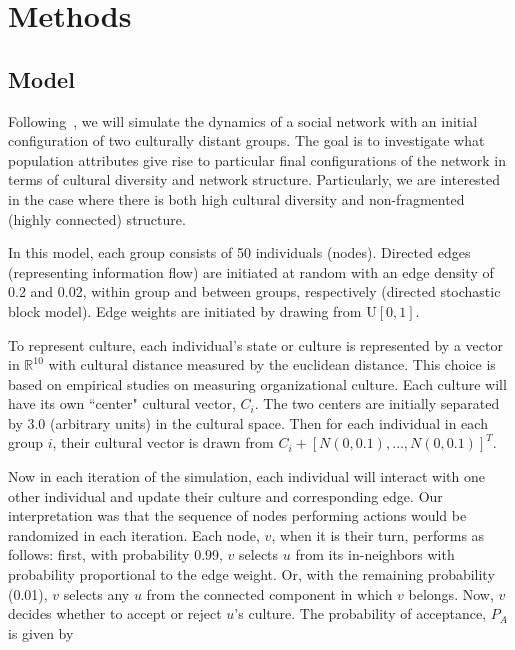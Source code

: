 \section{Methods}\label{sec:methods}

\subsection{Model}\label{subsec:model}
    Following~\citep{social-frag}, we will simulate the dynamics of a social network
    with an initial configuration of two culturally distant groups.
    The goal is to investigate what population attributes give rise to particular
    final configurations of the network in terms of cultural diversity and network structure.
    Particularly, we are interested in the case where there is both high
    cultural diversity and non-fragmented (highly connected) structure.

    In this model, each group consists of 50 individuals (nodes).
    Directed edges (representing information
    flow) are initiated at random with an edge density of 0.2 and 0.02, within group
    and between groups, respectively (directed stochastic block model).
    Edge weights are initiated by drawing from $\textrm{U}[0,1]$.

    To represent culture, each individual's state or culture is represented by a
    vector in $\mathbb{R}^{10}$ with cultural distance measured by the euclidean distance.
    This choice is based on empirical studies on measuring organizational culture.
    Each culture will have its own ``center" cultural vector, $C_i$.
    The two centers are initially
    separated by $3.0$ (arbitrary units) in the cultural space.
    Then for each individual in each group $i$, their cultural vector is drawn from
    $C_i + [N(0, 0.1), \dots , N(0, 0.1)]^T$.

    Now in each iteration of the simulation, each individual will interact with
    one other individual and update their culture and corresponding edge.
    Our interpretation was that the sequence of nodes performing actions would
    be randomized in each iteration.
    Each node, $v$, when it is their turn, performs as follows: first, with
    probability 0.99, $v$ selects $u$ from its in-neighbors with probability
    proportional to the edge weight.
    Or, with the remaining probability (0.01), $v$ selects any $u$ from the
    connected component in which $v$ belongs.
    Now, $v$ decides whether to accept or reject $u$'s culture.
    The probability of acceptance, $P_{A}$ is given by

